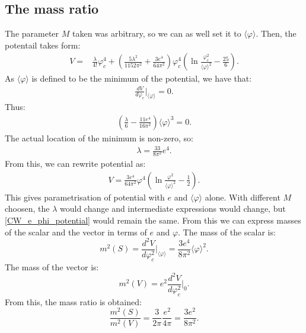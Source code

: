 \subsection{The mass ratio}
The parameter $M$ taken was arbitrary, so we can as well set it to $\langle\varphi\rangle$.
Then, the potentail takes form: 
\begin{align}
V = &\frac{\lambda}{4!}\varphi_c^4
+\left(\frac{5\lambda^2}{1152\pi^2}+\frac{3e^4}{64\pi^2}\right)\varphi_c^4
\left(\ln\frac{\varphi_c^2}{\langle\varphi\rangle^2}-\frac{25}{6}\right). 
\end{align} 
As $\langle\varphi\rangle$ is defined to be the minimum of the potential, we have that:
\begin{align}
\frac{dV}{d\varphi_c}\Big|_{\langle\varphi\rangle} = 0.
\end{align} 
Thus:
\begin{align}
\left(\frac{\lambda}{6}-\frac{11e^4}{16\pi^2}\right)\langle\varphi\rangle^3 = 0.
\end{align}
The actual location of the minimum is non-zero, so:
\begin{align}
\lambda = \frac{33}{8\pi^2}e^4.
\end{align}
From this, we can rewrite potential as:
\begin{align}\label{CW_e_phi_potential}
V = \frac{3e^4}{64\pi^2}\varphi^4\left(\ln{\frac{\varphi^2}{\langle\varphi\rangle^2}-
\frac{1}{2}}\right).
\end{align}
This gives parametrisation of potential with $e$ and $\langle\varphi\rangle$ alone. 
With different $M$ choosen, the $\lambda$ would change and intermediate expressions would change, 
but \ref{CW_e_phi_potential} would remain the same.
From this we can express masses of the scalar and the vector in terms of $e$ and $\varphi$.
The mass of the scalar is:
\begin{equation}
m^2(S) = \frac{d^2V}{d\varphi_c^2}\Big|_{\langle\varphi\rangle} = 
\frac{3e^4}{8\pi^2}\langle\varphi\rangle^2.
\end{equation}
The mass of the vector is:
\begin{equation}
m^2(V) = e^2\frac{d^2V}{d\varphi_c^2}\Big|_0.
\end{equation}
From this, the mass ratio is obtained:
\begin{equation}
\frac{m^2(S)}{m^2(V)} = \frac{3}{2\pi}\frac{e^2}{4\pi} = \frac{3e^2}{8\pi^2}.
\end{equation}
















